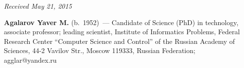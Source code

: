 \vspace*{-9pt}

\hfill{\small\textit{Received May 21, 2015}}

\Contrl

\noindent
\textbf{Agalarov Yaver M.} (b.\ 1952)~--- Candidate of Science (PhD) in technology, associate
professor; leading scientist, Institute of Informatics Problems, 
Federal Research Center ``Computer
Science and Control'' of the Russian Academy of Sciences, 44-2 Vavilov Str., Moscow 119333,
Russian Federation;  agglar@yandex.ru


\label{end\stat}


\renewcommand{\bibname}{\protect\rm Литература}
